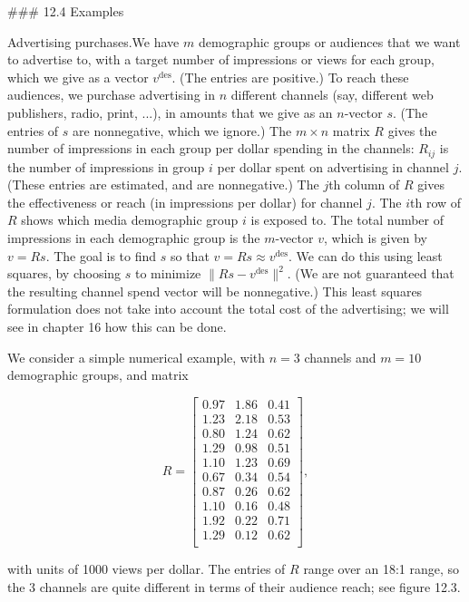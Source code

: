 

### 12.4 Examples

Advertising purchases.We have \(m\) demographic groups or audiences that we want to advertise to, with a target number of impressions or views for each group, which we give as a vector \(v^{\text{des}}\). (The entries are positive.) To reach these audiences, we purchase advertising in \(n\) different channels (say, different web publishers, radio, print, ...), in amounts that we give as an \(n\)-vector \(s\). (The entries of \(s\) are nonnegative, which we ignore.) The \(m\times n\) matrix \(R\) gives the number of impressions in each group per dollar spending in the channels: \(R_{ij}\) is the number of impressions in group \(i\) per dollar spent on advertising in channel \(j\). (These entries are estimated, and are nonnegative.) The \(j\)th column of \(R\) gives the effectiveness or reach (in impressions per dollar) for channel \(j\). The \(i\)th row of \(R\) shows which media demographic group \(i\) is exposed to. The total number of impressions in each demographic group is the \(m\)-vector \(v\), which is given by \(v=Rs\). The goal is to find \(s\) so that \(v=Rs\approx v^{\text{des}}\). We can do this using least squares, by choosing \(s\) to minimize \(\|Rs-v^{\text{des}}\|^{2}\). (We are not guaranteed that the resulting channel spend vector will be nonnegative.) This least squares formulation does not take into account the total cost of the advertising; we will see in chapter 16 how this can be done.

We consider a simple numerical example, with \(n=3\) channels and \(m=10\) demographic groups, and matrix

\[R=\left[\begin{array}{cccc}0.97&1.86&0.41\\ 1.23&2.18&0.53\\ 0.80&1.24&0.62\\ 1.29&0.98&0.51\\ 1.10&1.23&0.69\\ 0.67&0.34&0.54\\ 0.87&0.26&0.62\\ 1.10&0.16&0.48\\ 1.92&0.22&0.71\\ 1.29&0.12&0.62\\ \end{array}\right],\]

with units of 1000 views per dollar. The entries of \(R\) range over an 18:1 range, so the 3 channels are quite different in terms of their audience reach; see figure 12.3.

